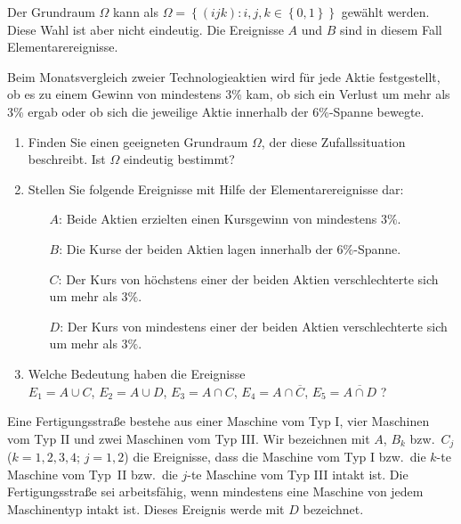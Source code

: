 \solution Der Grundraum $\Omega$ kann als $\Omega= \left\{ (ijk)
: i,j,k\in \left\{ 0,1 \right\} \right\}$ gewählt werden. Diese Wahl ist aber nicht 
eindeutig. Die Ereignisse $A$ und $B$ sind in diesem Fall Elementarereignisse. 


Beim Monatsvergleich zweier Technologieaktien wird für jede Aktie
festgestellt, ob es zu einem Gewinn von mindestens 3\% kam, ob sich ein Verlust
um mehr als 3\% ergab oder ob sich die jeweilige Aktie innerhalb der 6\%-Spanne
bewegte.
\begin{enumerate}
    \item Finden Sie einen geeigneten Grundraum $\Omega$, der diese
        Zufallssituation beschreibt. Ist $\Omega$ eindeutig bestimmt?
    \item Stellen Sie folgende Ereignisse mit Hilfe der Elementarereignisse
        dar:
        \begin{itemize}
            \item[$A$:] Beide Aktien erzielten einen Kursgewinn von mindestens $3\%$.
            \item[$B$:] Die Kurse der beiden Aktien lagen innerhalb der
                $6\%$-Spanne. %
            \item[$C$:] Der Kurs von höchstens einer der beiden Aktien
                verschlechterte sich um mehr als $3\%$. 
            \item[$D$:] Der Kurs von mindestens einer der beiden Aktien
                verschlechterte sich um mehr als $3\%$. 
        \end{itemize}
    \item Welche Bedeutung haben die Ereignisse\\
        $E_1=A\cup C$, $E_2=A\cup D$,
        $E_3=A\cap C$, $E_4=A\cap\overline{C}$, $E_5= \overline{A\cap D}$ ?
\end{enumerate}



Eine Fertigungsstraße bestehe  aus einer Maschine vom Typ I, vier Maschinen vom
Typ II und zwei Maschinen vom Typ III. Wir bezeichnen mit $A$, $B_k$ bzw.\
$C_j$ ($k=1,2,3,4$; $j=1,2$) die Ereignisse, dass die Maschine vom Typ I
bzw.~die $k$-te Maschine vom Typ~II bzw.~die $j$-te Maschine vom Typ III intakt
ist. Die Fertigungsstraße sei arbeitsfähig, wenn mindestens eine Maschine von
jedem Maschinentyp intakt ist. Dieses Ereignis werde mit $D$ bezeichnet.

